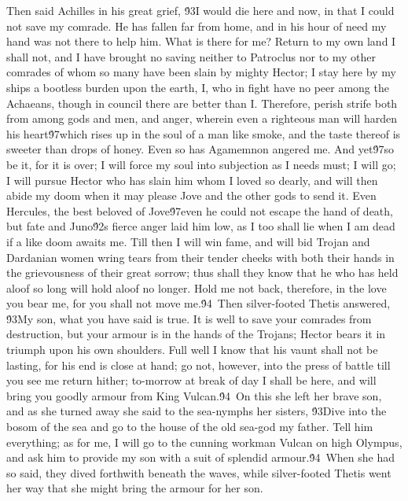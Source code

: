 {Then said Achilles in his great grief, \'93I would die here and now, in that I could not save my comrade. He has fallen far from home, and in his hour of need my hand was not there to help him. What is there for me? Return to my own land I shall not, and I have brought no saving neither to Patroclus nor to my other comrades of whom so many have been slain by mighty Hector; I stay here by my ships a bootless burden upon the earth, I, who in fight have no peer among the Achaeans, though in council there are better than I. Therefore, perish strife both from among gods and men, and anger, wherein even a righteous man will harden his heart\'97which rises up in the soul of a man like smoke, and the taste thereof is sweeter than drops of honey. Even so has Agamemnon angered me. And yet\'97so be it, for it is over; I will force my soul into subjection as I needs must; I will go; I will pursue Hector who has slain him whom I loved so dearly, and will then abide my doom when it may please Jove and the other gods to send it. Even Hercules, the best beloved of Jove\'97even he could not escape the hand of death, but fate and Juno\'92s fierce anger laid him low, as I too shall lie when I am dead if a like doom awaits me. Till then I will win fame, and will bid Trojan and Dardanian women wring tears from their tender cheeks with both their hands in the grievousness of their great sorrow; thus shall they know that he who has held aloof so long will hold aloof no longer. Hold me not back, therefore, in the love you bear me, for you shall not move me.\'94\
Then silver-footed Thetis answered, \'93My son, what you have said is true. It is well to save your comrades from destruction, but your armour is in the hands of the Trojans; Hector bears it in triumph upon his own shoulders. Full well I know that his vaunt shall not be lasting, for his end is close at hand; go not, however, into the press of battle till you see me return hither; to-morrow at break of day I shall be here, and will bring you goodly armour from King Vulcan.\'94\
On this she left her brave son, and as she turned away she said to the sea-nymphs her sisters, \'93Dive into the bosom of the sea and go to the house of the old sea-god my father. Tell him everything; as for me, I will go to the cunning workman Vulcan on high Olympus, and ask him to provide my son with a suit of splendid armour.\'94\
When she had so said, they dived forthwith beneath the waves, while silver-footed Thetis went her way that she might bring the armour for her son.\
}
